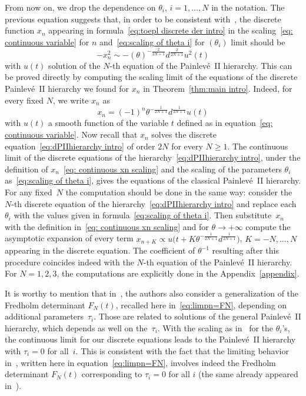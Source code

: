 \documentclass[pdftex]{sigma}%
\numberwithin{equation}{section}
\begin{document}
From now on, we drop the dependence on $\theta_i$, $i=1,\dots,N$ in the notation. The previous equation suggests that, in order to be consistent with~\cite[Theorem~1.1]{CafassoClaeysGirotti}, the discrete function $x_n$ appearing in formula~\eqref{eq:toepl discrete der intro} in the scaling~\eqref{eq: continuous variable} for $n$ and~\eqref{eq:scaling of theta i} for $(\theta_i)$ limit should be
\begin{equation*}
-x_n^2 \sim -(\theta)^{-\frac{2}{2N+1}}d^{\frac{2}{2N+1}} u^2(t)
\end{equation*}
with $u(t)$ solution of the $N$-th equation of the Painlev\'e~II hierarchy. This can be proved directly by computing the scaling limit of the equations of the discrete Painlev\'e~II hierarchy we found for $x_n$ in Theorem~\ref{thm:main intro}. Indeed, for every fixed $N$, we write $x_n$ as
\begin{equation}
	\label{eq: continuous xn scaling}
x_n=(-1)^n \theta^{-\frac{1}{2N+1}}d^{\frac{1}{2N+1}} u(t)
\end{equation}
with $u(t)$ a smooth function of the variable $t$ defined as in equation~\eqref{eq: continuous variable}.
Now recall that $x_n$ solves the discrete equation~\eqref{eq:dPIIhierarchy intro} of order $2N$ for every $N\geq 1$. The continuous limit of the discrete equations of the hierarchy~\eqref{eq:dPIIhierarchy intro}, under the definition of $x_n$~\eqref{eq: continuous xn scaling} and the scaling of the parameters $\theta_i$ as~\eqref{eq:scaling of theta i}, gives the equations of the classical Painlev\'e~II hierarchy. For any fixed~$N$ the computation should be done in the same way: consider the $N$-th discrete equation of the hierarchy~\eqref{eq:dPIIhierarchy intro} and replace each $\theta_i$ with the values given in formula~\eqref{eq:scaling of theta i}. Then substitute~$x_n$ with the definition in~\eqref{eq: continuous xn scaling} and for $\theta\rightarrow+\infty$ compute the asymptotic expansion of every term $x_{n+K}\propto u\big(t+K\theta^{-\frac{1}{2N+1}}d^{\frac{1}{2N+1}}\big)$, $K=-N,\dots,N$ appearing in the discrete equation. The coefficient of $\theta^{-1}$ resulting after this procedure coincides indeed with the $N$-th equation of the Painlev\'e~II hierarchy.
For $N=1,2,3$, the computations are explicitly done in the Appendix~\ref{appendix}.

\begin{Remark}
It is worthy to mention that in~\cite{CafassoClaeysGirotti}, the authors also consider a generalization of the Fredholm determinant $F_N(t)$, recalled here in~\eqref{eq:limpn=FN}, depending on additional parameters~$\tau_i$. Those are related to solutions of the general Painlev\'e~II hierarchy, which depends as well on the~$\tau_i$. With the scaling as in~\cite{betea2021multicritical} for the $\theta_i$'s, the continuous limit for our discrete equations leads to the Painlev\'e~II hierarchy with $\tau_i=0$ for all~$i$. This is consistent with the fact that the limiting behavior in~\cite{betea2021multicritical}, written here in equation~\eqref{eq:limpn=FN}, involves indeed the Fredholm determinant $F_N(t)$ corresponding to $\tau_i=0$ for all $i$ (the same already appeared in~\cite{LDMS18}). \end{Remark}
\end{document}
